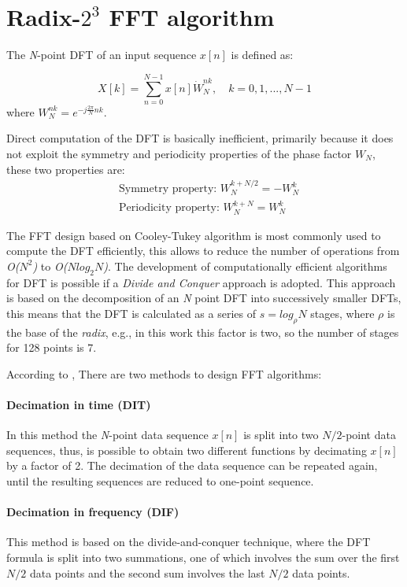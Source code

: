 \documentclass[10pt,times,mathptm,psfig,final,journal,comsoc]{IEEEtran}
\begin{document}
\section{Radix-$2^3$ FFT algorithm} \label{sec:equa}
The \textit{N}-point DFT of an input sequence $x[n]$ is defined as:

\begin{equation}
	X[k] = \sum_{n=0}^{N-1} x[n] \dot W_N^{nk}, \quad k=0,1,...,N-1
\end{equation}
where $W_N^{nk} = e^{-j\frac{2\pi}{N} nk}$. 

Direct computation of the DFT is basically inefficient, primarily because it does not exploit the symmetry and periodicity properties of the phase factor $W_N$, these two properties are:
\begin{align}
	&\text{Symmetry property: } W_N^{k+N/2} = -W_N^k	\\
	&\text{Periodicity property: } W_N^{k+N} = W_N^k
\end{align}

The FFT design based on Cooley-Tukey algorithm is most commonly used to compute the DFT efficiently, this allows to reduce the number of operations from \textit{O($N^2$)} to \textit{O($Nlog_2N$)}. 
The development of computationally efficient algorithms for DFT is possible if a \textit{Divide and Conquer} approach is adopted. This approach is based on the decomposition of an \textit{N} point DFT into successively smaller DFTs, this means that the DFT is calculated as a series of $s=log_\rho N$ stages, where $\rho$ is the base of the \textit{radix}, e.g., in this work this factor is two, so the number of stages for 128 points is 7.

According to \cite{proakis_digital_nodate,oppenheim_tratamiento_2011}, There are two methods to design FFT algorithms: 
\paragraph{Decimation in time (DIT)}
In this method the \textit{N}-point data sequence $x[n]$ is split into two $N/2$-point data sequences, thus, is possible to obtain two different functions by decimating $x[n]$ by a factor of 2. The decimation of the data sequence can be repeated again, until the resulting sequences are reduced to one-point sequence. 
\paragraph{Decimation in frequency (DIF)}
This method is based on the divide-and-conquer technique, where the DFT formula is split into two summations, one of which involves the sum over the first $N/2$ data points and the second sum involves the last $N/2$ data points.
\end{document}
